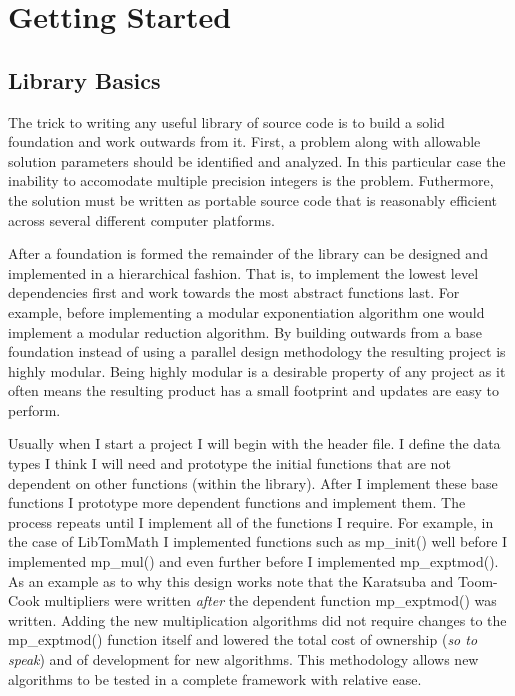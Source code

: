 \documentclass[b5paper]{book}
\begin{document}
\chapter{Getting Started}
\section{Library Basics}
The trick to writing any useful library of source code is to build a solid foundation and work outwards from it.  First, 
a problem along with allowable solution parameters should be identified and analyzed.  In this particular case the 
inability to accomodate multiple precision integers is the problem.  Futhermore, the solution must be written
as portable source code that is reasonably efficient across several different computer platforms.

After a foundation is formed the remainder of the library can be designed and implemented in a hierarchical fashion.  
That is, to implement the lowest level dependencies first and work towards the most abstract functions last.  For example, 
before implementing a modular exponentiation algorithm one would implement a modular reduction algorithm.
By building outwards from a base foundation instead of using a parallel design methodology the resulting project is 
highly modular.  Being highly modular is a desirable property of any project as it often means the resulting product
has a small footprint and updates are easy to perform.  

Usually when I start a project I will begin with the header file.  I define the data types I think I will need and 
prototype the initial functions that are not dependent on other functions (within the library).  After I 
implement these base functions I prototype more dependent functions and implement them.   The process repeats until
I implement all of the functions I require.  For example, in the case of LibTomMath I implemented functions such as 
mp\_init() well before I implemented mp\_mul() and even further before I implemented mp\_exptmod().  As an example as to 
why this design works note that the Karatsuba and Toom-Cook multipliers were written \textit{after} the 
dependent function mp\_exptmod() was written.  Adding the new multiplication algorithms did not require changes to the 
mp\_exptmod() function itself and lowered the total cost of ownership (\textit{so to speak}) and of development 
for new algorithms.  This methodology allows new algorithms to be tested in a complete framework with relative ease.
\end{document}
